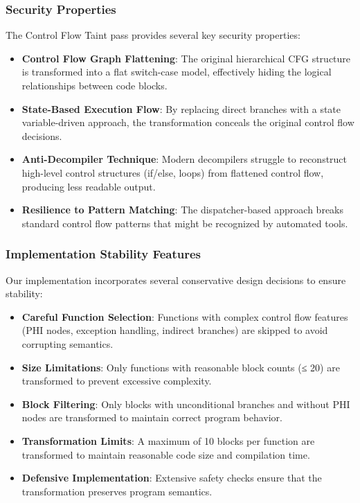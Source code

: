 \documentclass[conference]{IEEEtran}
\begin{document}
\subsubsection{Security Properties}
The Control Flow Taint pass provides several key security properties:

\begin{itemize}
    \item \textbf{Control Flow Graph Flattening}: The original hierarchical CFG structure is transformed into a flat switch-case model, effectively hiding the logical relationships between code blocks.
    
    \item \textbf{State-Based Execution Flow}: By replacing direct branches with a state variable-driven approach, the transformation conceals the original control flow decisions.
    
    \item \textbf{Anti-Decompiler Technique}: Modern decompilers struggle to reconstruct high-level control structures (if/else, loops) from flattened control flow, producing less readable output.
    
    \item \textbf{Resilience to Pattern Matching}: The dispatcher-based approach breaks standard control flow patterns that might be recognized by automated tools.
\end{itemize}

\subsubsection{Implementation Stability Features}
Our implementation incorporates several conservative design decisions to ensure stability:

\begin{itemize}
    \item \textbf{Careful Function Selection}: Functions with complex control flow features (PHI nodes, exception handling, indirect branches) are skipped to avoid corrupting semantics.
    
    \item \textbf{Size Limitations}: Only functions with reasonable block counts (≤ 20) are transformed to prevent excessive complexity.
    
    \item \textbf{Block Filtering}: Only blocks with unconditional branches and without PHI nodes are transformed to maintain correct program behavior.
    
    \item \textbf{Transformation Limits}: A maximum of 10 blocks per function are transformed to maintain reasonable code size and compilation time.
    
    \item \textbf{Defensive Implementation}: Extensive safety checks ensure that the transformation preserves program semantics.
\end{itemize}
\end{document}
